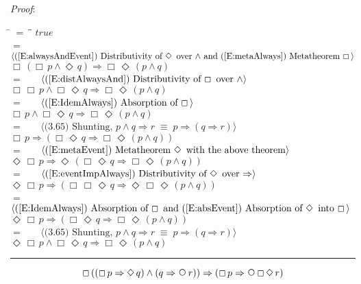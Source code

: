 \documentclass[12pt, fleqn, leqno]{article}
\newcommand{\lgap}{2pt}                             %
\newcommand{\mymathindent}{24pt}                    %
\newcommand{\equivs}{\ensuremath{\;\equiv\;}}       %
\newcommand{\impl}{\ensuremath{\Rightarrow}}        %
\newcommand{\Next}{\;\,\text{\raisebox{3.5pt}{\circle{6}}}}
\newcommand{\Event}{\Diamond\,}
\newcommand{\Always}{\Box\,}
\newcommand{\myqed}{\rule[-.23ex]{1.2ex}{2.0ex}}
\newcommand{\myqedtab}{\hspace{384pt}}              %
\newcommand{\Gll} {\langle}                         %
\newcommand{\Ggg} {\rangle}                         %
\newcommand{\Hint}[1]     {\ \ \ $\Gll              \mbox{#1} \Ggg$ }   %
\begin{document}
\emph{Proof}:
\begin{tabbing}
\hspace{\mymathindent} \= $= \;$ \= \myqedtab \= \kill
\> \>   $true$\\[\lgap]
\> $=$  \>  \Hint{(\ref{E:alwaysAndEvent}) Distributivity of $\Event$ over $\land$ and (\ref{E:metaAlways}) Metatheorem $\Always$}\\[\lgap]
\> \>   $\Always (\Always p \land \Event q) \impl \Always\Event (p \land q)$\\[\lgap]
\> $=$  \>  \Hint{(\ref{E:distAlwaysAnd}) Distributivity of $\Always$ over $\land$}\\[\lgap]
\> \>   $\Always \Always p \land \Always\Event q \impl \Always\Event (p \land q)$\\[\lgap]
\> $=$  \>  \Hint{(\ref{E:IdemAlways}) Absorption of $\Always$}\\[\lgap]
\> \>   $\Always p \land \Always\Event q \impl \Always\Event (p \land q)$\\[\lgap]
\> $=$  \>  \Hint{(3.65) Shunting, $p\land q\impl r\equivs p\impl (q\impl r)$}\\[\lgap]
\> \>   $\Always p \impl (\Always\Event q \impl \Always\Event (p \land q))$\\[\lgap]
\> $=$  \>  \Hint{(\ref{E:metaEvent}) Metatheorem $\Event$ with the above theorem}\\[\lgap]
\> \>   $\Event\Always p \impl \Event(\Always\Event q \impl \Always\Event (p \land q))$\\[\lgap]
\> $=$  \>  \Hint{(\ref{E:eventImpAlways}) Distributivity of $\Event$ over $\impl$}\\[\lgap]
\> \>   $\Event\Always p \impl (\Always\Always\Event q \impl \Event\Always\Event (p \land q))$\\[\lgap]
\> $=$  \>  \Hint{(\ref{E:IdemAlways}) Absorption of $\Always$ and (\ref{E:absEvent}) Absorption of $\Event$ into $\Always$}\\[\lgap]
\> \>   $\Event\Always p \impl (\Always\Event q \impl \Always\Event (p \land q))$\\[\lgap]
\> $=$  \>  \Hint{(3.65) Shunting, $p\land q\impl r\equivs p\impl (q\impl r)$}\\[\lgap]
\> \>   $\Event\Always p\land \Always\Event q \impl \Always\Event (p\land q)$ \quad \myqed
\end{tabbing}
\begin{equation}\label{E:kroger49}
 \Always ((\Always p \impl \Event q) \land (q \impl \Next r)) \impl (\Always p \impl \Next \Always \Event r)
\end{equation}
\end{document}
